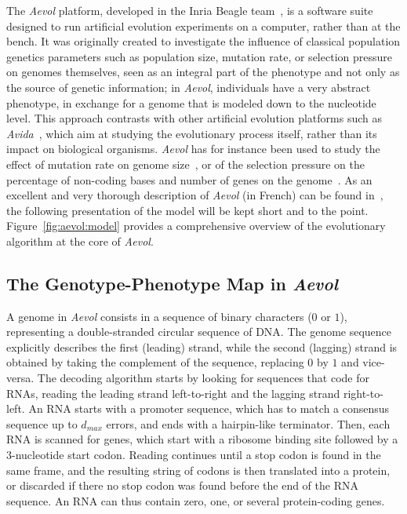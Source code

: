The \emph{Aevol} platform, developed in the Inria Beagle team~\citep{rutten2019}, is a software suite designed to run artificial evolution experiments on a computer, rather than at the bench.
It was originally created to investigate the influence of classical population genetics parameters such as population size, mutation rate, or selection pressure on genomes themselves, seen as an integral part of the phenotype and not only as the source of genetic information; in \emph{Aevol}, individuals have a very abstract phenotype, in exchange for a genome that is modeled down to the nucleotide level.
This approach contrasts with other artificial evolution platforms such as \emph{Avida}~\citep{adami1994,ofria2004}, which aim at studying the evolutionary process itself, rather than its impact on biological organisms.
\emph{Aevol} has for instance been used to study the effect of mutation rate on genome size~\citep{knibbe2005}, or of the selection pressure on the percentage of non-coding bases and number of genes on the genome~\citep{batut2013}.
As an excellent and very thorough description of \emph{Aevol} (in French) can be found in~\cite{liard2020b}, the following presentation of the model will be kept short and to the point.
Figure~\ref{fig:aevol:model} provides a comprehensive overview of the evolutionary algorithm at the core of \emph{Aevol}.

\subsection{The Genotype-Phenotype Map in \emph{Aevol}}

A genome in \emph{Aevol} consists in a sequence of binary characters ($0$ or $1$), representing a double-stranded circular sequence of DNA.
The genome sequence explicitly describes the first (leading) strand, while the second (lagging) strand is obtained by taking the complement of the sequence, replacing $0$ by $1$ and vice-versa.
The decoding algorithm starts by looking for sequences that code for RNAs, reading the leading strand left-to-right and the lagging strand right-to-left.
An RNA starts with a promoter sequence, which has to match a consensus sequence up to $d_{max}$ errors, and ends with a hairpin-like terminator.
Then, each RNA is scanned for genes, which start with a ribosome binding site followed by a 3-nucleotide start codon.
Reading continues until a stop codon is found in the same frame, and the resulting string of codons is then translated into a protein, or discarded if there no stop codon was found before the end of the RNA sequence.
An RNA can thus contain zero, one, or several protein-coding genes.

